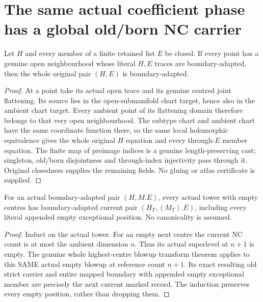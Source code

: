 \section{The same actual coefficient phase has a global old/born NC carrier}
\label{sec:nc-global-phase-carrier}

\begin{lemma}
\label{hir:nc-boundary-adapted-of-actual-open-traces}
\leanok
Let $H$ and every member of a finite retained list $E$ be closed. If every
point has a genuine open neighbourhood whose literal $H,E$ traces are
boundary-adapted, then the whole original pair $(H,E)$ is boundary-adapted.
\end{lemma}
\begin{proof}
At a point take its actual open trace and its genuine centred joint
flattening. Its source lies in the open-submanifold chart target, hence also
in the ambient chart target. Every ambient point of its flattening domain
therefore belongs to that very open neighbourhood. The subtype chart and
ambient chart have the same coordinate function there, so the same local
holomorphic equivalence gives the whole original $H$ equation and every
through-$E$ member equation. The finite map of preimage indices is a genuine
length-preserving cast; singleton, old/born disjointness and through-index
injectivity pass through it. Original closedness supplies the remaining
fields. No gluing or atlas certificate is supplied.
\end{proof}

\begin{lemma}
\label{hir:nc-boundary-adapted-actual-empty-tower}
\leanok
For an actual boundary-adapted pair $(H,M.E)$, every actual tower with empty
centres has boundary-adapted current pair $(H_T,(M_T).E)$, including every
literal appended empty exceptional position. No canonicality is assumed.
\end{lemma}
\begin{proof}
Induct on the actual tower. For an empty next centre the current NC count is
at most the ambient dimension $n$. Thus its actual superlevel at $n+1$ is
empty. The genuine whole highest-centre blowup transform theorem applies to
this SAME actual empty blowup at reference count $n+1$. Its exact resulting
old strict carrier and entire mapped boundary with appended empty
exceptional member are precisely the next current marked record. The
induction preserves every empty position, rather than dropping them.
\end{proof}

